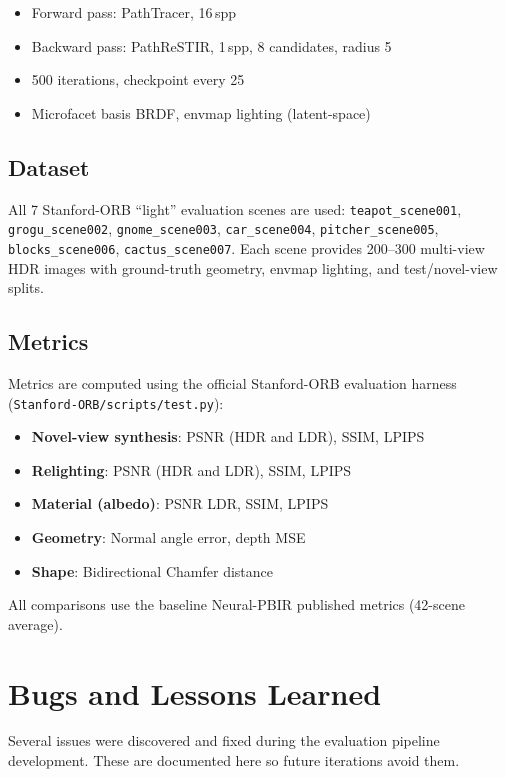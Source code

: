 \begin{itemize}
    \item Forward pass: PathTracer, 16\,spp
    \item Backward pass: PathReSTIR, 1\,spp, 8 candidates, radius 5
    \item 500 iterations, checkpoint every 25
    \item Microfacet basis BRDF, envmap lighting (latent-space)
\end{itemize}

\subsection{Dataset}

All 7 Stanford-ORB ``light'' evaluation scenes are used:
\texttt{teapot\_scene001}, \texttt{grogu\_scene002}, \texttt{gnome\_scene003},
\texttt{car\_scene004}, \texttt{pitcher\_scene005}, \texttt{blocks\_scene006},
\texttt{cactus\_scene007}. Each scene provides 200--300 multi-view HDR images
with ground-truth geometry, envmap lighting, and test/novel-view splits.

\subsection{Metrics}

Metrics are computed using the official Stanford-ORB evaluation harness
(\texttt{Stanford-ORB/scripts/test.py}):

\begin{itemize}
    \item \textbf{Novel-view synthesis}: PSNR (HDR and LDR), SSIM, LPIPS
    \item \textbf{Relighting}: PSNR (HDR and LDR), SSIM, LPIPS
    \item \textbf{Material (albedo)}: PSNR LDR, SSIM, LPIPS
    \item \textbf{Geometry}: Normal angle error, depth MSE
    \item \textbf{Shape}: Bidirectional Chamfer distance
\end{itemize}

All comparisons use the baseline Neural-PBIR published metrics (42-scene average).

\section{Bugs and Lessons Learned}

Several issues were discovered and fixed during the evaluation pipeline
development. These are documented here so future iterations avoid them.

